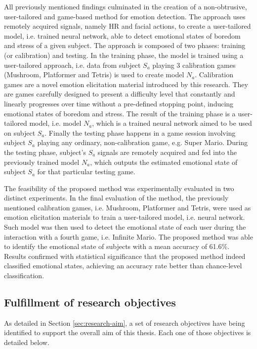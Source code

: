 All previously mentioned findings culminated in the creation of a non-obtrusive, user-tailored and game-based method for emotion detection. The approach uses remotely acquired signals, namely HR and facial actions, to create a user-tailored model, i.e. trained neural network, able to detect emotional states of boredom and stress of a given subject. The approach is composed of two phases: training (or calibration) and testing. In the training phase, the model is trained using a user-tailored approach, i.e. data from subject $S_a$ playing 3 calibration games (Mushroom, Platformer and Tetris) is used to create model $N_a$. Calibration games are a novel emotion elicitation material introduced by this research. They are games carefully designed to present a difficulty level that constantly and linearly progresses over time without a pre-defined stopping point, inducing emotional states of boredom and stress. The result of the training phase is a user-tailored model, i.e. model $N_a$, which is a trained neural network aimed to be used on subject $S_a$. Finally the testing phase happens in a game session involving subject $S_a$ playing any ordinary, non-calibration game, e.g. Super Mario. During the testing phase, subject's $S_a$ signals are remotely acquired and fed into the previously trained model $N_a$, which outputs the estimated emotional state of subject $S_a$ for that particular testing game.

The feasibility of the proposed method was experimentally evaluated in two distinct experiments. In the final evaluation of the method, the previously mentioned calibration games, i.e. Mushroom, Platformer and Tetris, were used as emotion elicitation materials to train a user-tailored model, i.e. neural network. Such model was then used to detect the emotional state of each user during the interaction with a fourth game, i.e. Infinite Mario. The proposed method was able to identify the emotional state of subjects with a mean accuracy of 61.6\%. Results confirmed with statistical significance that the proposed method indeed classified emotional states, achieving an accuracy rate better than chance-level classification.

\subsection{Fulfillment of research objectives}

As detailed in Section \ref{sec:research-aim}, a set of research objectives have being identified to support the overall aim of this thesis. Each one of those objectives is detailed below.

